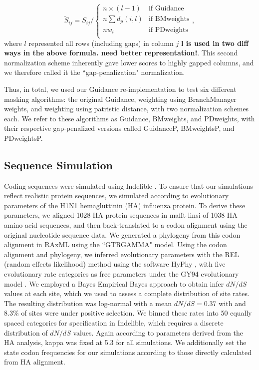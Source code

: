 \documentclass[10pt]{article}
\begin{document}
\begin{equation} \widetilde{S}_{ij} = S_{ij} \bigg/ \left\{ \begin{array}{rl}
              n\times (l-1)                                   &\mbox{if Guidance} \\
              n\sum d_p(i,l)                         &\mbox{if BMweights} \\
   		  nw_i                                       &\mbox{if PDweights} \\          
         \end{array} \right.,
\end{equation}
where $l$ represented all rows (including gaps) in column $j$ \textbf{l is used in two diff ways in the above formula. need better representation!}. This second normalization scheme inherently gave lower scores to highly gapped columns, and we therefore called it the ``gap-penalization" normalization.

Thus, in total, we used our Guidance re-implementation to test six different masking algorithms: the original Guidance, weighting using BranchManager weights, and weighting using patristic distance, with two normalization schemes each. We refer to these algorithms as Guidance, BMweights, and PDweights, with their respective gap-penalized versions called GuidanceP, BMweightsP, and PDweightsP.



\subsection*{Sequence Simulation}
Coding sequences were simulated using Indelible \citep{Fletcher2009}. To ensure that our simulations reflect realistic protein sequences, we simulated according to evolutionary parameters of the H1N1 hemagluttinin (HA) influenza protein. To derive these parameters, we aligned 1028 HA protein sequences in mafft linsi \citep{Katoh2005} of 1038 HA amino acid sequences, and then back-translated to a codon alignment using the original nucleotide sequence data. We generated a phylogeny from this codon alignment in RAxML \citep{Stamatakis2006} using the ``GTRGAMMA" model. Using the codon alignment and phylogeny, we inferred evolutionary parameters with the REL (random effects likelihood)  method \citep{NielsenYang1998} using the software HyPhy \citep{Pond2005}, with five evolutionary rate categories as free parameters under the GY94 evolutionary model \citep{GoldmanYang1994}. We employed a Bayes Empirical Bayes approach \citep{Yang2000} to obtain infer $dN/dS$ values at each site, which we used to assess a complete distribution of site rates. The resulting distribution was log-normal with a mean $dN/dS = 0.37$ with and 8.3\% of sites were under positive selection. We binned these rates into 50 equally spaced categories for specification in Indelible, which requires a discrete distribution of $dN/dS$ values. Again according to parameters derived from the HA analysis, kappa was fixed at 5.3 for all simulations. We additionally set the state codon frequencies for our simulations according to those directly calculated from HA alignment. 
\end{document}
